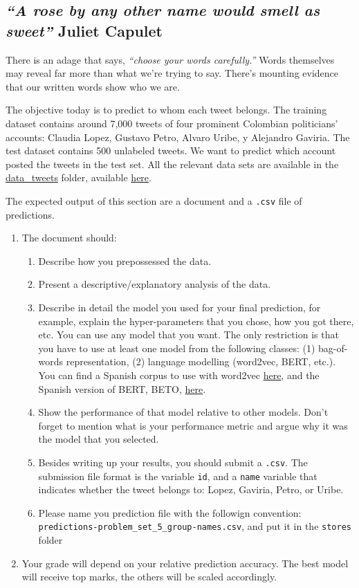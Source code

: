 \documentclass[12pt,onecolumn]{article}
\begin{document}
\subsection{{\it ``A rose by any other name would smell as sweet''} Juliet Capulet}

There is an adage that says, {\it “choose your words carefully.”} Words themselves may reveal far more than what we’re trying to say. There’s mounting evidence that our written words show who we are.

The objective today is to predict to whom each tweet belongs. The training dataset contains around 7,000 tweets of four prominent Colombian politicians' accounts: Claudia Lopez, Gustavo Petro, Alvaro Uribe, y Alejandro Gaviria. The test dataset contains 500 unlabeled tweets. We want to predict which account posted the tweets in the test set. All the relevant data sets are available in the \href{https://www.dropbox.com/s/gewpk6r1ii9u5h3/data_tweets.zip?dl=0}{data\_tweets} folder, available \href{https://www.dropbox.com/s/gewpk6r1ii9u5h3/data_tweets.zip?dl=0}{here}.


The expected output of this section are a document and a \texttt{.csv} file of predictions. 

\begin{enumerate}
  \item  The document should:
  \begin{enumerate}
    \item Describe how you prepossessed the data.
    \item Present a descriptive/explanatory analysis of the data.
    \item Describe in detail the model you used for your final prediction, for example, explain the hyper-parameters that you chose, how you got there, etc.  You can use any model that you want. The only restriction is that you have to use at least one model from the following classes: (1) bag-of-words representation, (2) language modelling (word2vec, BERT, etc.). You can find a Spanish corpus to use with word2vec \href{https://crscardellino.ar/SBWCE/}{here}, and the Spanish version of BERT, BETO, \href{https://github.com/dccuchile/beto}{here}.
    \item Show the performance of that model relative to other models. Don't forget to mention what is your performance metric and argue why it was the model that you selected.
    \item Besides writing up your results, you should submit a \texttt{.csv}. The submission file format is the variable \texttt{id}, and a \texttt{name} variable that indicates whether the tweet belongs to: Lopez, Gaviria, Petro, or Uribe. 
    \item Please name you prediction file with the followign convention: \texttt{predictions-problem\_set\_5\_group-names.csv}, and put it in the \texttt{stores} folder
  \end{enumerate}
  \item Your grade will depend on your relative prediction accuracy. The best model will receive top marks, the others will be scaled accordingly.
  
\end{enumerate}
\end{document}
